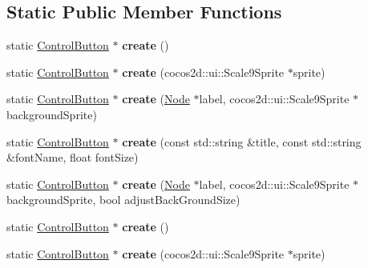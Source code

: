 \subsection*{Static Public Member Functions}
\begin{DoxyCompactItemize}
\item 
\mbox{\label{classControlButton_a9978609664e1f9faa1e27e23a22b409b}} 
static \hyperlink{classControlButton}{Control\+Button} $\ast$ {\bfseries create} ()
\item 
\mbox{\label{classControlButton_aca7d8f80582a80e886347ffe543c3b25}} 
static \hyperlink{classControlButton}{Control\+Button} $\ast$ {\bfseries create} (cocos2d\+::ui\+::\+Scale9\+Sprite $\ast$sprite)
\item 
\mbox{\label{classControlButton_a9e14964455543ebda9e22b0db3abff75}} 
static \hyperlink{classControlButton}{Control\+Button} $\ast$ {\bfseries create} (\hyperlink{classNode}{Node} $\ast$label, cocos2d\+::ui\+::\+Scale9\+Sprite $\ast$background\+Sprite)
\item 
\mbox{\label{classControlButton_acdd0a6448b7557e3193320cf7a5b4ce1}} 
static \hyperlink{classControlButton}{Control\+Button} $\ast$ {\bfseries create} (const std\+::string \&title, const std\+::string \&font\+Name, float font\+Size)
\item 
\mbox{\label{classControlButton_a7debf4e3abb4ecb760b9d8b61d4b52bc}} 
static \hyperlink{classControlButton}{Control\+Button} $\ast$ {\bfseries create} (\hyperlink{classNode}{Node} $\ast$label, cocos2d\+::ui\+::\+Scale9\+Sprite $\ast$background\+Sprite, bool adjust\+Back\+Ground\+Size)
\item 
\mbox{\label{classControlButton_a80d6bf17cf8dfc0ed105b2e0bbf67830}} 
static \hyperlink{classControlButton}{Control\+Button} $\ast$ {\bfseries create} ()
\item 
\mbox{\label{classControlButton_a7c6b0aa0ee4bc1734621db0dfb799f4e}} 
static \hyperlink{classControlButton}{Control\+Button} $\ast$ {\bfseries create} (cocos2d\+::ui\+::\+Scale9\+Sprite $\ast$sprite)
\item 
\mbox{\label{classControlButton_a48e9ef280d3661e70c3ddc83aea67f9b}} 

\end{DoxyCompactItemize}
